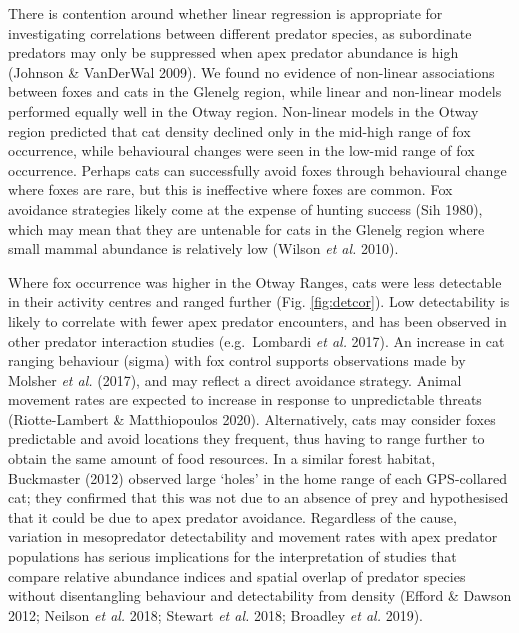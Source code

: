 \documentclass[]{elsarticle} %
\begin{document}
There is contention around whether linear regression is appropriate for investigating correlations between different predator species, as subordinate predators may only be suppressed when apex predator abundance is high (Johnson \& VanDerWal 2009). We found no evidence of non-linear associations between foxes and cats in the Glenelg region, while linear and non-linear models performed equally well in the Otway region. Non-linear models in the Otway region predicted that cat density declined only in the mid-high range of fox occurrence, while behavioural changes were seen in the low-mid range of fox occurrence. Perhaps cats can successfully avoid foxes through behavioural change where foxes are rare, but this is ineffective where foxes are common. Fox avoidance strategies likely come at the expense of hunting success (Sih 1980), which may mean that they are untenable for cats in the Glenelg region where small mammal abundance is relatively low (Wilson \emph{et al.} 2010).

Where fox occurrence was higher in the Otway Ranges, cats were less detectable in their activity centres and ranged further (Fig. \ref{fig:detcor}). Low detectability is likely to correlate with fewer apex predator encounters, and has been observed in other predator interaction studies (e.g.~Lombardi \emph{et al.} 2017). An increase in cat ranging behaviour (sigma) with fox control supports observations made by Molsher \emph{et al.} (2017), and may reflect a direct avoidance strategy. Animal movement rates are expected to increase in response to unpredictable threats (Riotte-Lambert \& Matthiopoulos 2020). Alternatively, cats may consider foxes predictable and avoid locations they frequent, thus having to range further to obtain the same amount of food resources. In a similar forest habitat, Buckmaster (2012) observed large `holes' in the home range of each GPS-collared cat; they confirmed that this was not due to an absence of prey and hypothesised that it could be due to apex predator avoidance. Regardless of the cause, variation in mesopredator detectability and movement rates with apex predator populations has serious implications for the interpretation of studies that compare relative abundance indices and spatial overlap of predator species without disentangling behaviour and detectability from density (Efford \& Dawson 2012; Neilson \emph{et al.} 2018; Stewart \emph{et al.} 2018; Broadley \emph{et al.} 2019).
\end{document}
